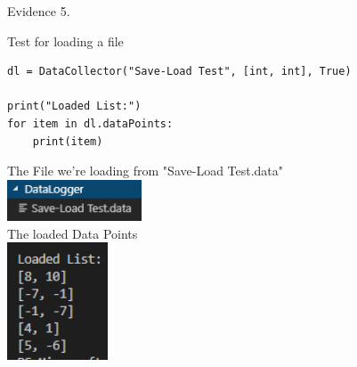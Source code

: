 \begin{flushleft}
\begin{center}
        {\large Evidence 5.\rn } \\ 
        \vspace{0.3cm}

        Test for loading a file
        \begin{verbatim}
dl = DataCollector("Save-Load Test", [int, int], True)

print("Loaded List:")
for item in dl.dataPoints:
    print(item)
        \end{verbatim}

        The File we're loading from "Save-Load Test.data" \\
        \includegraphics[width=4cm]{Images/Testing/T4.8.2.PNG} \\
        The loaded Data Points \\
        \includegraphics[width=3cm]{Images/Testing/T4.9.1.PNG} \\
        \vspace{1cm}
    \end{center}
   
\end{flushleft}